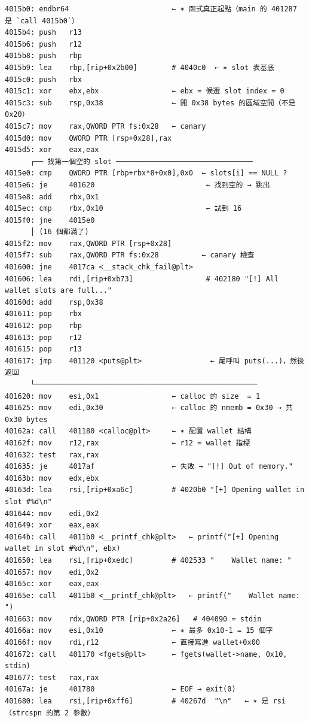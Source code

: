 \documentclass[10pt,a4paper]{article}
\begin{document}
\begin{Verbatim}[breaklines=true,breakanywhere=true,breakautoindent=false,fontsize=\fontsize{7.0}{9.5}\selectfont]
4015b0: endbr64                        ← ✶ 函式真正起點（main 的 401287 是 `call 4015b0`）
4015b4: push   r13
4015b6: push   r12
4015b8: push   rbp
4015b9: lea    rbp,[rip+0x2b00]        # 4040c0  ← ✶ slot 表基底
4015c0: push   rbx
4015c1: xor    ebx,ebx                 ← ebx = 候選 slot index = 0
4015c3: sub    rsp,0x38                ← 開 0x38 bytes 的區域空間（不是 0x20）
4015c7: mov    rax,QWORD PTR fs:0x28   ← canary
4015d0: mov    QWORD PTR [rsp+0x28],rax
4015d5: xor    eax,eax
      ┌── 找第一個空的 slot ────────────────────────────────
4015e0: cmp    QWORD PTR [rbp+rbx*8+0x0],0x0  ← slots[i] == NULL ?
4015e6: je     401620                          ← 找到空的 → 跳出
4015e8: add    rbx,0x1
4015ec: cmp    rbx,0x10                        ← 試到 16
4015f0: jne    4015e0
      │ (16 個都滿了)
4015f2: mov    rax,QWORD PTR [rsp+0x28]
4015f7: sub    rax,QWORD PTR fs:0x28          ← canary 檢查
401600: jne    4017ca <__stack_chk_fail@plt>
401606: lea    rdi,[rip+0xb73]                 # 402180 "[!] All wallet slots are full..."
40160d: add    rsp,0x38
401611: pop    rbx
401612: pop    rbp
401613: pop    r12
401615: pop    r13
401617: jmp    401120 <puts@plt>                ← 尾呼叫 puts(...)，然後返回
      └────────────────────────────────────────────────────
401620: mov    esi,0x1                 ← calloc 的 size  = 1
401625: mov    edi,0x30                ← calloc 的 nmemb = 0x30 → 共 0x30 bytes
40162a: call   401180 <calloc@plt>     ← ✶ 配置 wallet 結構
40162f: mov    r12,rax                 ← r12 = wallet 指標
401632: test   rax,rax
401635: je     4017af                  ← 失敗 → "[!] Out of memory."
40163b: mov    edx,ebx
40163d: lea    rsi,[rip+0xa6c]         # 4020b0 "[+] Opening wallet in slot #%d\n"
401644: mov    edi,0x2
401649: xor    eax,eax
40164b: call   4011b0 <__printf_chk@plt>   ← printf("[+] Opening wallet in slot #%d\n", ebx)
401650: lea    rsi,[rip+0xedc]         # 402533 "    Wallet name: "
401657: mov    edi,0x2
40165c: xor    eax,eax
40165e: call   4011b0 <__printf_chk@plt>   ← printf("    Wallet name: ")
401663: mov    rdx,QWORD PTR [rip+0x2a26]   # 404090 = stdin
40166a: mov    esi,0x10                ← ✶ 最多 0x10-1 = 15 個字
40166f: mov    rdi,r12                 ← 直接寫進 wallet+0x00
401672: call   401170 <fgets@plt>      ← fgets(wallet->name, 0x10, stdin)
401677: test   rax,rax
40167a: je     401780                  ← EOF → exit(0)
401680: lea    rsi,[rip+0xff6]         # 40267d  "\n"   ← ✶ 是 rsi（strcspn 的第 2 參數）

\end{Verbatim}
\end{document}
